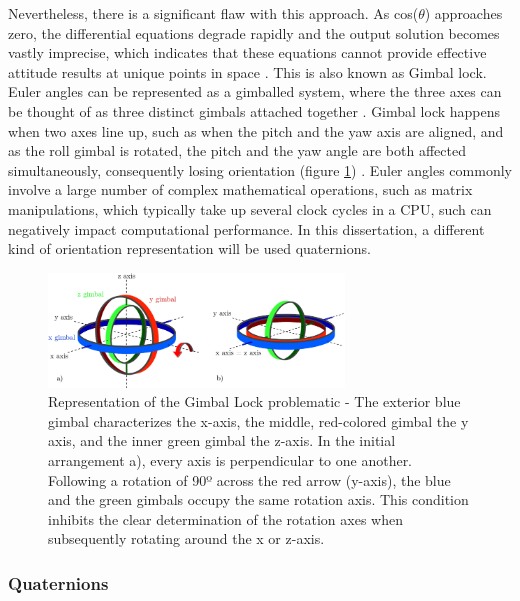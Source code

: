 Nevertheless, there is a significant flaw with this approach. As cos($\theta$) approaches zero, the differential equations degrade rapidly and the output solution becomes vastly imprecise, which indicates that these equations cannot provide effective attitude results at unique points in space \cite{spring1986euler}. This is also known as Gimbal lock. Euler angles can be represented as a gimballed system, where the three axes can be thought of as three distinct gimbals attached together \cite{mcconnell1967kinematics}. Gimbal lock happens when two axes line up, such as when the pitch and the yaw axis are aligned, and as the roll gimbal is rotated, the pitch and the yaw angle are both affected simultaneously, consequently losing orientation (figure \ref{fig:gimbal_lock}) \cite{hemingway2018perspectives}.
Euler angles commonly involve a large number of complex mathematical operations, such as matrix manipulations, which typically take up several clock cycles in a CPU, such can negatively impact computational performance. In this dissertation, a different kind of orientation representation will be used quaternions.

\begin{figure}[!h]
  \centering
  \includegraphics[width=0.7\textwidth]{figures/gimbal_lock.png}
  \caption{Representation of the Gimbal Lock problematic \cite{zeitlhofler2019nominal} - The exterior blue gimbal characterizes the x-axis, the middle, red-colored gimbal the y axis, and the inner green gimbal the z-axis. In the initial arrangement a), every axis is perpendicular to one another. Following a rotation of 90º across the red arrow (y-axis), the blue and the green gimbals occupy the same rotation axis. This condition inhibits the clear determination of the rotation axes when subsequently rotating around the x or z-axis. }
  \label{fig:gimbal_lock}
\end{figure}

\subsubsection{Quaternions}

